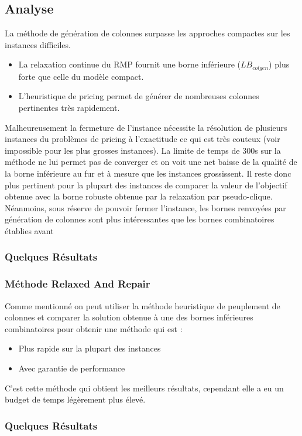 \documentclass{article}
\begin{document}
\subsection{Analyse}

La méthode de génération de colonnes surpasse les approches compactes sur les instances difficiles.
\begin{itemize}
    \item La relaxation continue du RMP fournit une borne inférieure ($LB_{colgen}$) plus forte que celle du modèle compact.
    \item L'heuristique de pricing permet de générer de nombreuses colonnes pertinentes très rapidement.
\end{itemize}
Malheureusement la fermeture de l'instance nécessite la résolution de plusieurs instances du problèmes de pricing à l'exactitude ce qui est très couteux (voir impossible pour les plus grosses instances). La limite de temps de 300s sur la méthode ne lui permet pas de converger et on voit une net baisse de la qualité de la borne inférieure au fur et à mesure que les instances grossissent. 
Il reste donc plus pertinent pour la plupart des instances de comparer la valeur de l'objectif obtenue avec la borne robuste obtenue par la relaxation par pseudo-clique.
Néanmoins, sous réserve de pouvoir fermer l'instance, les bornes renvoyées par génération de colonnes sont plus intéressantes que les bornes combinatoires établies avant
\subsubsection*{Quelques Résultats}

\subsubsection{Méthode Relaxed And Repair}
Comme mentionné on peut utiliser la méthode heuristique de peuplement de colonnes et comparer la solution obtenue à une des bornes inférieures combinatoires pour obtenir une méthode qui est :
\begin{itemize}
    \item Plus rapide sur la plupart des instances
    \item Avec garantie de performance
\end{itemize}
C'est cette méthode qui obtient les meilleurs résultats, cependant elle a eu un budget de temps légèrement plus élevé.
\subsubsection*{Quelques Résultats}

\end{document}
